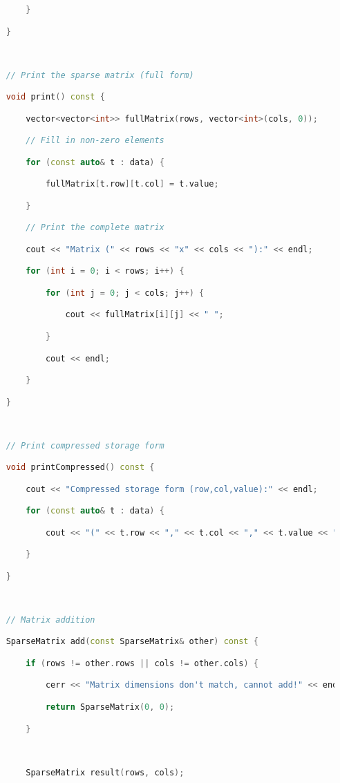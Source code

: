\begin{lstlisting}[language=C++]
        }

    }

  

    // Print the sparse matrix (full form)

    void print() const {

        vector<vector<int>> fullMatrix(rows, vector<int>(cols, 0));

        // Fill in non-zero elements

        for (const auto& t : data) {

            fullMatrix[t.row][t.col] = t.value;

        }

        // Print the complete matrix

        cout << "Matrix (" << rows << "x" << cols << "):" << endl;

        for (int i = 0; i < rows; i++) {

            for (int j = 0; j < cols; j++) {

                cout << fullMatrix[i][j] << " ";

            }

            cout << endl;

        }

    }

  

    // Print compressed storage form

    void printCompressed() const {

        cout << "Compressed storage form (row,col,value):" << endl;

        for (const auto& t : data) {

            cout << "(" << t.row << "," << t.col << "," << t.value << ")" << endl;

        }

    }

  

    // Matrix addition

    SparseMatrix add(const SparseMatrix& other) const {

        if (rows != other.rows || cols != other.cols) {

            cerr << "Matrix dimensions don't match, cannot add!" << endl;

            return SparseMatrix(0, 0);

        }

  

        SparseMatrix result(rows, cols);


\end{lstlisting}
